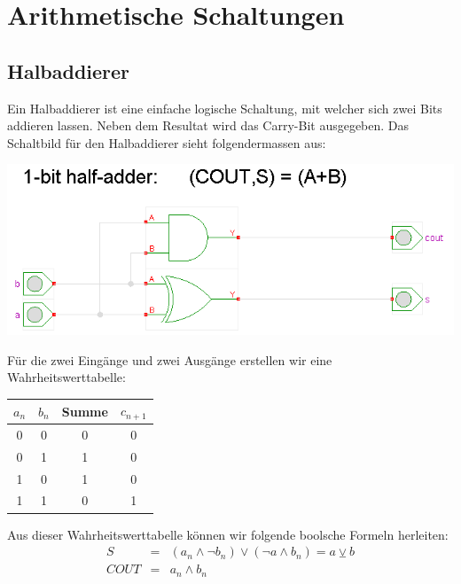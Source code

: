 \documentclass{report}
\begin{document}
\section{Arithmetische Schaltungen}
\subsection{Halbaddierer}
Ein Halbaddierer ist eine einfache logische Schaltung, mit welcher sich zwei Bits addieren lassen. Neben dem Resultat wird das Carry-Bit ausgegeben. Das Schaltbild für den Halbaddierer sieht folgendermassen aus:
\begin{center}\includegraphics[scale=0.3]{img/half-adder.png}\end{center}
Für die zwei Eingänge und zwei Ausgänge erstellen wir eine Wahrheitswerttabelle:
\begin{center}\begin{tabular}{c c | c c}
$a_n$ & $b_n$ & Summe & $c_{n+1}$ \\ \hline
0 & 0 & 0 & 0 \\
0 & 1 & 1 & 0 \\
1 & 0 & 1 & 0 \\
1 & 1 & 0 & 1\end{tabular}\end{center}
Aus dieser Wahrheitswerttabelle können wir folgende boolsche Formeln herleiten:
\begin{eqnarray}
S & = & (a_n \land \lnot b_n) \lor (\lnot a \land b_n) = a \veebar b \\
COUT & = & a_n \land b_n\end{eqnarray}
\end{document}
